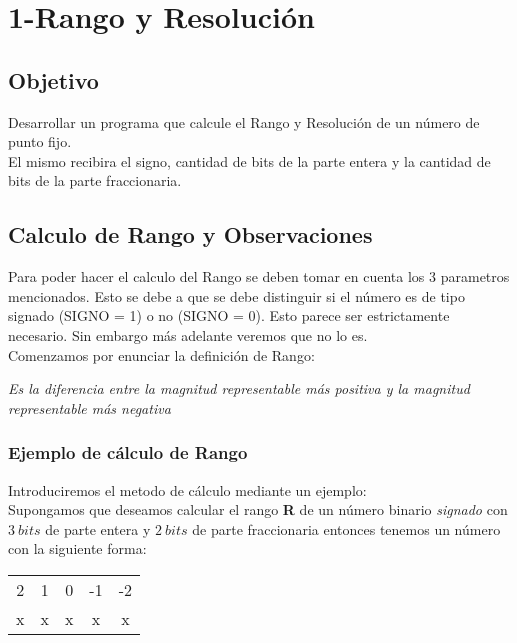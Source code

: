 
%
\chapter*{1-Rango y Resoluci\'on}

\section{Objetivo}
\indent\indent  Desarrollar un programa que calcule el Rango y Resoluci\'on de un n\'umero de punto fijo.\\
\indent El mismo recibira el signo, cantidad de bits de la parte entera y la cantidad de bits de la parte fraccionaria.
\section{Calculo de Rango y Observaciones}
\indent\indent Para poder hacer el calculo del Rango se deben tomar en cuenta los 3 parametros mencionados. Esto se debe a que se debe distinguir si el n\' umero es de tipo signado (SIGNO = 1) o no (SIGNO = 0). Esto parece ser estrictamente necesario. Sin embargo m\'as adelante veremos que no lo es.
\\ \indent Comenzamos por enunciar la definici\'on de Rango:\\
	\begin{center}
	\emph{Es la diferencia entre la magnitud representable m\'as positiva y la magnitud representable m\'as negativa}
	\end{center}

\subsection{Ejemplo de c\'alculo de Rango}
\indent\indent Introduciremos el metodo de c\'alculo mediante un ejemplo:\\
\indent Supongamos que deseamos calcular el rango \textbf{R} de un n\'umero binario \textit{signado} con $3\ bits$ de parte entera y $2\ bits$ de parte fraccionaria entonces tenemos un n\'umero con la siguiente forma:



\begin{center}
\begin{tabular}{ |c|c|c|c|c| } 
 \hline
 2 & 1 & 0 & -1 & -2 \\ 
 x & x & x  & x & x\\ 
 \hline
\end{tabular}
\end{center}

